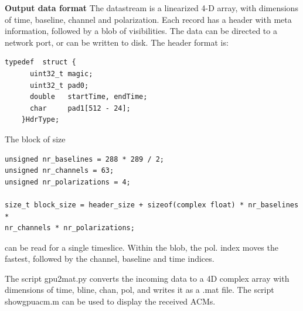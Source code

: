 \documentclass {article}
\begin{document}
\textbf{Output data  format} The  datastream is a  linearized 4-D  array, with
dimensions  of time,  baseline, channel  and polarization.  Each record  has a
header with meta  information, followed by a blob of  visibilities. The data
can be directed to a network port, or can be written to disk. The header
format is:
\begin{verbatim}
typedef  struct {
      uint32_t magic;
      uint32_t pad0;
      double   startTime, endTime;
      char     pad1[512 - 24];
    }HdrType;
\end{verbatim}
The block of size
\begin{verbatim}
unsigned nr_baselines = 288 * 289 / 2;
unsigned nr_channels = 63;
unsigned nr_polarizations = 4;

size_t block_size = header_size + sizeof(complex float) * nr_baselines *
nr_channels * nr_polarizations;
\end{verbatim}
can be read for a single timeslice. Within the blob, the pol. index moves the
fastest, followed by the channel, baseline and time indices.

The script gpu2mat.py converts the incoming data to a 4D complex array with dimensions
of time, bline, chan, pol, and writes it as a .mat file. The script
showgpuacm.m can be used to display the received ACMs.
\end{document}
